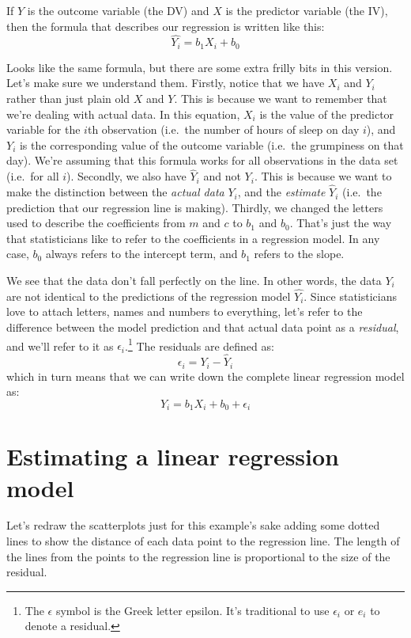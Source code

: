 \documentclass[
  11pt,
  a4paper,
  twoside,symmetric,openright]{book}
\theoremstyle{break}
\theoremstyle{break}
\begin{document}
If \(Y\) is the outcome variable (the DV) and \(X\) is the predictor variable (the IV), then the formula that describes our regression is written like this:
\[
\hat{Y_i} = b_1 X_i + b_0
\]

Looks like the same formula, but there are some extra frilly bits in this version. Let's make sure we understand them. Firstly, notice that we have \(X_i\) and \(Y_i\) rather than just plain old \(X\) and \(Y\). This is because we want to remember that we're dealing with actual data. In this equation, \(X_i\) is the value of the predictor variable for the \(i\)th observation (i.e.~the number of hours of sleep on day \(i\)), and \(Y_i\) is the corresponding value of the outcome variable (i.e.~the grumpiness on that day). We're assuming that this formula works for all observations in the data set (i.e.~for all \(i\)). Secondly, we also have \(\hat{Y}_i\) and not \(Y_i\). This is because we want to make the distinction between the \emph{actual data} \(Y_i\), and the \emph{estimate} \(\hat{Y}_i\) (i.e.~the prediction that our regression line is making). Thirdly, we changed the letters used to describe the coefficients from \(m\) and \(c\) to \(b_1\) and \(b_0\). That's just the way that statisticians like to refer to the coefficients in a regression model. In any case, \(b_0\) always refers to the intercept term, and \(b_1\) refers to the slope.

We see that the data don't fall perfectly on the line. In other words, the data \(Y_i\) are not identical to the predictions of the regression model \(\hat{Y_i}\). Since statisticians love to attach letters, names and numbers to everything, let's refer to the difference between the model prediction and that actual data point as a \emph{residual}, and we'll refer to it as \(\epsilon_i\).\footnote{The \(\epsilon\) symbol is the Greek letter epsilon. It's traditional to use \(\epsilon_i\) or \(e_i\) to denote a residual.} The residuals are defined as:
\[
\epsilon_i = Y_i - \hat{Y}_i
\]
which in turn means that we can write down the complete linear regression model as:
\[
Y_i = b_1 X_i + b_0 + \epsilon_i
\]

\section{Estimating a linear regression model}\label{regressionestimation}

Let's redraw the scatterplots just for this example's sake adding some dotted lines to show the distance of each data point to the regression line. The length of the lines from the points to the regression line is proportional to the size of the residual.
\end{document}
